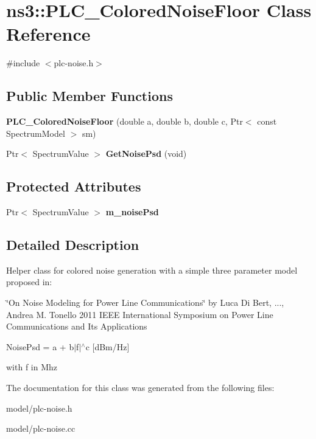\hypertarget{classns3_1_1PLC__ColoredNoiseFloor}{\section{ns3\-:\-:\-P\-L\-C\-\_\-\-Colored\-Noise\-Floor \-Class \-Reference}
\label{classns3_1_1PLC__ColoredNoiseFloor}
}


{\ttfamily \#include $<$plc-\/noise.\-h$>$}

\subsection*{\-Public \-Member \-Functions}
\begin{DoxyCompactItemize}
\item 
\hypertarget{classns3_1_1PLC__ColoredNoiseFloor_ab858fcfc40d2125f8689445ede999b30}{{\bfseries \-P\-L\-C\-\_\-\-Colored\-Noise\-Floor} (double a, double b, double c, \-Ptr$<$ const \-Spectrum\-Model $>$ sm)}\label{classns3_1_1PLC__ColoredNoiseFloor_ab858fcfc40d2125f8689445ede999b30}

\item 
\hypertarget{classns3_1_1PLC__ColoredNoiseFloor_a2aa0978aca331068e4cbb36a2d521d4d}{\-Ptr$<$ \-Spectrum\-Value $>$ {\bfseries \-Get\-Noise\-Psd} (void)}\label{classns3_1_1PLC__ColoredNoiseFloor_a2aa0978aca331068e4cbb36a2d521d4d}

\end{DoxyCompactItemize}
\subsection*{\-Protected \-Attributes}
\begin{DoxyCompactItemize}
\item 
\hypertarget{classns3_1_1PLC__ColoredNoiseFloor_a2da0e6d409fb21fcc291b8067d9e7526}{\-Ptr$<$ \-Spectrum\-Value $>$ {\bfseries m\-\_\-noise\-Psd}}\label{classns3_1_1PLC__ColoredNoiseFloor_a2da0e6d409fb21fcc291b8067d9e7526}

\end{DoxyCompactItemize}


\subsection{\-Detailed \-Description}
\-Helper class for colored noise generation with a simple three parameter model proposed in\-:

\char`\"{}\-On Noise Modeling for Power Line Communications\char`\"{} by \-Luca \-Di \-Bert, ..., \-Andrea \-M. \-Tonello 2011 \-I\-E\-E\-E \-International \-Symposium on \-Power \-Line \-Communications and \-Its \-Applications

\-Noise\-Psd = a + b$|$f$|$$^\wedge$c \mbox{[}d\-Bm/\-Hz\mbox{]}

with f in \-Mhz 

\-The documentation for this class was generated from the following files\-:\begin{DoxyCompactItemize}
\item 
model/plc-\/noise.\-h\item 
model/plc-\/noise.\-cc\end{DoxyCompactItemize}
